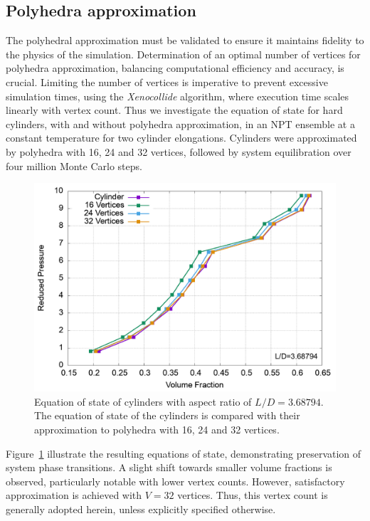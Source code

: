 \documentclass[aip,jcp, amsmath, amssymb, reprint]{revtex4-1}
\begin{document}
\subsection{Polyhedra approximation}
The polyhedral approximation must be validated to ensure it maintains fidelity to the physics of the simulation.
Determination of an optimal number of vertices for polyhedra approximation, balancing computational efficiency and
accuracy, is crucial. Limiting the number of vertices is imperative to prevent excessive simulation times, using the
\textit{Xenocollide} algorithm, where execution time scales linearly with vertex count. Thus we investigate the equation
of state for hard cylinders, with and without polyhedra approximation, in an NPT ensemble at a constant temperature for
two cylinder elongations. Cylinders were approximated by polyhedra with 16, 24 and 32 vertices, followed by system
equilibration over four million Monte Carlo steps.
\begin{figure}[h!] \includegraphics[width=0.9\linewidth]{cylapprox.png}
  \caption{\label{fig:cylapprox} Equation of state of cylinders with aspect ratio of $L/D=3.68794$. The equation of
  state of the cylinders is compared with their approximation to polyhedra with 16, 24 and 32 vertices.}
\end{figure}

Figure~\ref{fig:cylapprox} illustrate the resulting equations of state, demonstrating preservation of system phase
transitions. A slight shift towards smaller volume fractions is observed, particularly notable with lower vertex counts.
However, satisfactory approximation is achieved with $V=32$ vertices. Thus, this vertex count is generally adopted
herein, unless explicitly specified otherwise.
\end{document}

